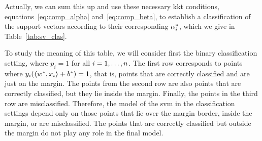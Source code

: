 %
Actually, we can sum this up and use these necessary \acrshort{kkt} conditions, equations~\eqref{eq:comp_alpha} and~\eqref{eq:comp_beta}, to establish a classification of the support vectors according to their corresponding $\opt{\alpha}_i$, which we give in Table~\ref{tab:sv_clas}.
%
\begin{table}[t!]
    \caption{Classification of the vectors in terms of the value of $\opt{\alpha}_i$. The first three rows illustrate the support vectors, while the last one illustrates those instances that are not support vectors.}
    \label{tab:sv_clas}
    \centering
\end{table}
%
To study the meaning of this table, we will consider first the binary classification setting, where $p_i=1$ for all $i=1, \ldots, n$. The first row corresponds to points where $y_i (\bm{\left\langle} {w}^*, x_i \bm{\right\rangle} + {b}^*) = 1$, that is, points that are correctly classified and are just on the margin. The points from the second row are also points that are correctly classified, but they lie inside the margin. Finally, the points in the third row are misclassified.
Therefore, the model of the \acrshort{svm} in the classification settings depend only on those points that lie over the margin border, inside the margin, or are misclassified. The points that are correctly classified but outside the margin do not play any role in the final model.
%

